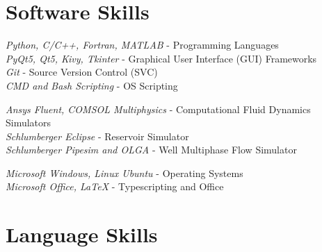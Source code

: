 \documentclass[10pt]{article} %
\begin{document}

\section{Software Skills}

{
\textit{Python, C/C++, Fortran, MATLAB} - Programming Languages\\
\textit{PyQt5, Qt5, Kivy, Tkinter} - Graphical User Interface (GUI) Frameworks\\
\textit{Git} - Source Version Control (SVC)\\
\textit{CMD and Bash Scripting} - OS Scripting
}


{
\textit{Ansys Fluent, COMSOL Multiphysics} - Computational Fluid Dynamics Simulators\\
\textit{Schlumberger Eclipse} - Reservoir Simulator\\
\textit{Schlumberger Pipesim and OLGA} - Well Multiphase Flow Simulator
}


{
\textit{Microsoft Windows, Linux Ubuntu} - Operating Systems\\
\textit{Microsoft Office, \LaTeX} - Typescripting and Office
}


\section{Language Skills}



\end{document}
